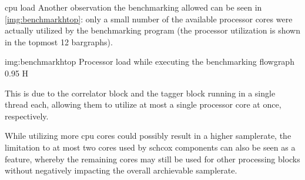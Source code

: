 \begin{subchapter}{\Acrshort{cpu} load}
  Another observation the benchmarking allowed can be seen
  in \autoref{img:benchmarkhtop}: only a small number of the available
  processor cores were actually utilized by the benchmarking program
  (the processor utilization is shown in the topmost 12 bargraphs).

                  {img:benchmarkhtop}
                  {Processor load while executing the benchmarking flowgraph}
                  {0.95}
                  {H}

  This is due to the correlator block and the tagger block running
  in a single thread each, allowing them to utilize at most
  a single processor core at once, respectively.

  While utilizing more \gls{cpu} cores could possibly
  result in a higher samplerate, the limitation to at most
  two cores used by \gls{schcox} components can
  also be seen as a feature, whereby the remaining cores
  may still be used for other processing blocks without
  negatively impacting the overall archievable samplerate.
\end{subchapter}
